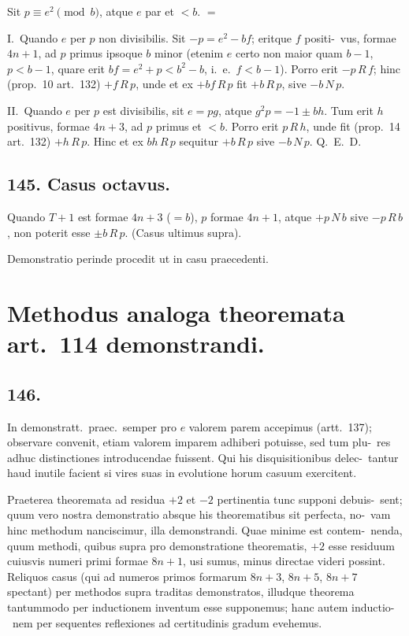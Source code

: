 \documentclass[12pt,a4paper]{article}
\theoremstyle{plain}
\theoremstyle{definition}
\theoremstyle{remark}
\begin{document}
Sit $p \equiv e^2 \pmod{b}$, atque $e$ par et $< b$. $=$

I.\ Quando $e$ per $p$ non divisibilis. Sit $-p = e^2 - bf$; eritque $f$ positi-\ vus, formae $4n+1$, ad $p$ primus ipsoque $b$ minor (etenim $e$ certo non maior
quam $b-1$, $p < b-1$, quare erit $bf = e^2 + p < b^2 - b$, i.~e.\ $f < b-1$). Porro
erit $-p \, R \, f$; hinc (prop.~10 art.~132) $+f \, R \, p$, unde et ex $+bf \, R \, p$ fit $+b \, R \, p$,
sive $-b \, N \, p$.

II.\ Quando $e$ per $p$ est divisibilis, sit $e = pg$, atque $g^2p = -1 \pm bh$.
Tum erit $h$ positivus, formae $4n+3$, ad $p$ primus et $< b$. Porro erit $p \, R \, h$,
unde fit (prop.~14 art.~132) $+h \, R \, p$. Hinc et ex $bh \, R \, p$ sequitur $+b \, R \, p$ sive
$-b \, N \, p$. Q.~E.~D.

\subsection*{145. Casus octavus.}

Quando $T+1$ est formae $4n+3$ ($= b$), $p$ formae $4n+1$,
atque $+p \, N \, b$ sive $-p \, R \, b$, non poterit esse $\pm b \, R \, p$. (Casus ultimus supra).

Demonstratio perinde procedit ut in casu praecedenti.


\section*{Methodus analoga theoremata art.~114 demonstrandi.}

\subsection*{146.}

In demonstratt.\ praec.\ semper pro $e$ valorem parem accepimus (artt.~137); observare convenit, etiam valorem imparem adhiberi potuisse, sed tum plu-\ res adhuc distinctiones introducendae fuissent. Qui his disquisitionibus delec-\ tantur haud inutile facient si vires suas in evolutione horum casuum exercitent.

Praeterea theoremata ad residua $+2$ et $-2$ pertinentia tunc supponi debuis-\ sent; quum vero nostra demonstratio absque his theorematibus sit perfecta, no-\ vam hinc methodum nanciscimur, illa demonstrandi. Quae minime est contem-\ nenda, quum methodi, quibus supra pro demonstratione theorematis, $+2$
esse residuum cuiusvis numeri primi formae $8n+1$, usi sumus, minus directae videri
possint. Reliquos casus (qui ad numeros primos formarum $8n+3$, $8n+5$,
$8n+7$ spectant) per methodos supra traditas demonstratos, illudque theorema
tantummodo per inductionem inventum esse supponemus; hanc autem inductio-\ nem per sequentes reflexiones ad certitudinis gradum evehemus.
\end{document}
